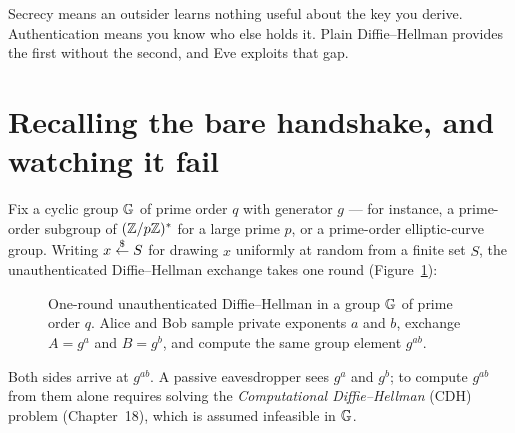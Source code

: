 \begin{intuitionbox}
Secrecy means an outsider learns nothing useful about the key you derive.
Authentication means you know who else holds it. Plain Diffie--Hellman provides
the first without the second, and Eve exploits that gap.
\end{intuitionbox}

\section{Recalling the bare handshake, and watching it fail}

Fix a cyclic group $\mathbb{G}$ of prime order $q$ with generator $g$ --- for instance,
a prime-order subgroup of $(\mathbb{Z}/p\mathbb{Z})^{*}$ for a large prime $p$, or a prime-order
elliptic-curve group. Writing $x \stackrel{\$}{\gets} S$ for drawing $x$ uniformly at random
from a finite set $S$, the unauthenticated Diffie--Hellman exchange takes one
round (Figure~\ref{ch23:fig-bare-dh}):

\begin{figure}[htbp]
\centering
{}
\caption{One-round unauthenticated Diffie--Hellman in a group $\mathbb{G}$ of prime order $q$. Alice and Bob sample private exponents $a$ and $b$, exchange $A=g^a$ and $B=g^b$, and compute the same group element $g^{ab}$.}
\label{ch23:fig-bare-dh}
\end{figure}

Both sides arrive at $g^{ab}$. A passive eavesdropper sees $g^a$ and $g^b$; to
compute $g^{ab}$ from them alone requires solving the \emph{Computational
Diffie--Hellman} (CDH) problem (Chapter~18), which is assumed infeasible in $\mathbb{G}$.

